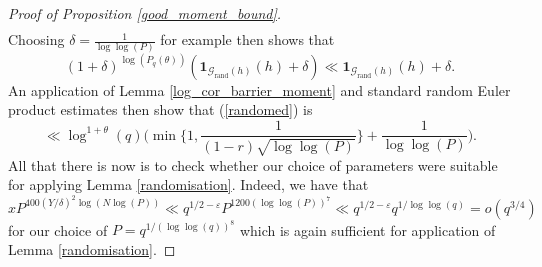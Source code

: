 \documentclass[reqno]{amsart}
\theoremstyle{definition}
\theoremstyle{remark}
\numberwithin{equation}{section}
\theoremstyle{remark}
\begin{document}
\begin{proof}[Proof of Proposition \ref{good_moment_bound}]
\begin{align*}
\end{align*}
Choosing $\delta = \frac{1}{\log\log(P)}$ for example then shows that
$$(1+\delta)^{\log(P_q(\theta))}(\mathbf{1}_{\mathcal{G}_{\text{rand}}(h)}(h)+\delta) \ll \mathbf{1}_{\mathcal{G}_{\text{rand}}(h)}(h)+\delta.$$
An application of Lemma \ref{log_cor_barrier_moment} and standard random Euler product estimates then show that (\ref{randomed}) is
$$\ll \log^{1+\theta}(q)\big(\min\big\{1,\frac{1}{(1-r)\sqrt{\log\log(P)}}\big\}+\frac{1}{\log\log(P)}\big).$$
All that there is now is to check whether our choice of parameters were suitable for applying Lemma \ref{randomisation}. Indeed, we have that $$xP^{400(Y/\delta)^2\log(N\log(P))} \ll q^{1/2-\varepsilon}P^{1200(\log\log(P))^7} \ll q^{1/2-\varepsilon}q^{1/\log\log(q)} = o(q^{3/4})$$ for our choice of $P = q^{1/(\log\log(q))^8}$ which is again sufficient for application of Lemma \ref{randomisation}.
\end{proof}
\end{document}
